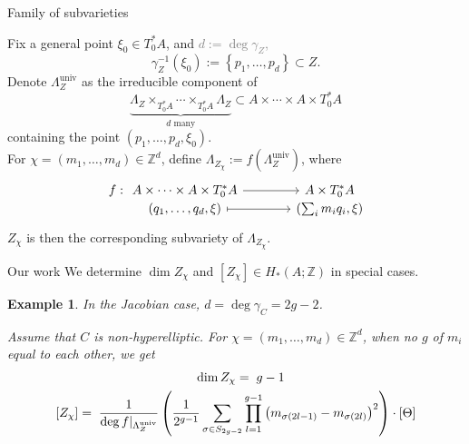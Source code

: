 \documentclass[pdf]{beamer}
\numberwithin{equation}{section}
\theoremstyle{plain}
\newtheorem{eg}[theorem]{Example}
\theoremstyle{plain}
\theoremstyle{remark}
\newcommand*{\ignore}[1]{\textcolor{gray}{#1}}
\DeclareMathOperator{\univ}{\operatorname{univ}}
\begin{document}
\begin{frame}[fragile]{Family of subvarieties}
\begin{definition}
Fix a general point $\xi_0 \in T_0^*A$, and \ignore{$d:=\deg \gamma_Z$,}
$$\gamma_Z^{-1}(\xi_0):= \left\{ p_1,\ldots,p_d \right\} \subset Z.$$
Denote $\Lambda_Z^{\univ}$ as the irreducible component of 
$$\underbrace{\Lambda_Z \times_{T_0^* A} \cdots \times_{T_0^* A} \Lambda_Z}_{\text{$d$ many}} \subset A \times \cdots \times A \times T_0^* A$$
containing the point $(p_1,\ldots,p_d, \xi_0)$.
\\[3mm]

For $\chi=(m_1,\ldots,m_d) \in \mathbb{Z}^d$, define $\Lambda_{Z_{\chi}}:= f(\Lambda_Z^{\univ})$, where 
\[\begin{tikzcd}[ampersand replacement=\&,column sep={between origins, 40mm},row sep={-1mm}]
	{f:} \&[-21mm] {A \times \cdots \times A \times T_0^* A} \& {A \times T_0^* A} \\
	\& {(q_1,\ldots,q_d,\xi)} \& {\left( \sum_i m_iq_i, \xi \right)}
	\arrow[from=1-2, to=1-3]
	\arrow[maps to, from=2-2, to=2-3]
\end{tikzcd}\]
$Z_{\chi}$ is then the corresponding subvariety of $\Lambda_{Z_{\chi}}$.
\end{definition}
\end{frame}
\endgroup

\begin{frame}[fragile]{Our work}
We determine $\dim Z_{\chi}$ and $[Z_{\chi}] \in H_*(A;\mathbb{Z})$ in special cases.
\begin{eg}
In the Jacobian case, $d=\deg \gamma_C = 2g-2$.

Assume that $C$ is non-hyperelliptic. For $\chi=(m_1,\ldots,m_d) \in \mathbb{Z}^d$, when no $g$ of $m_i$ equal to each other, we get 
\begin{equation*}
\begin{aligned}
  &\hspace{10mm}\dim Z_{\chi} =\; g-1 \\ 
  [Z_{\chi}]=\;\frac{1}{\deg f|_{\Lambda_Z^{\univ}}}&\left( \frac{1}{2^{g-1}} \sum_{\sigma \in S_{2g-2}} \prod_{l=1}^{g-1} \left( m_{\sigma(2l-1)}-m_{\sigma(2l)} \right)^2  \right) \cdot [\Theta]
\end{aligned}
\end{equation*}
\end{eg}
\end{frame}
\end{document}
